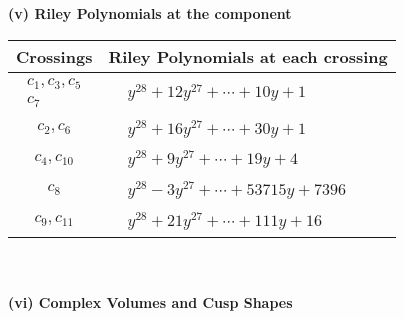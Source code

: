 \documentclass[1p]{elsarticle_modified}
\theoremstyle{definition}
\begin{document}
\newpage\renewcommand{\arraystretch}{1}
\flushleft \textbf{(v) Riley Polynomials at the component}\newline \\
\begin{tabular}{m{50pt}|m{274pt}}
Crossings & \hspace{64pt}Riley Polynomials at each crossing \\
\hline $$\begin{aligned}c_{1},c_{3},c_{5}\\c_{7}\end{aligned}$$&$\begin{aligned}
&y^{28}+12 y^{27}+\cdots+10 y+1
\end{aligned}$\\
\hline $$\begin{aligned}c_{2},c_{6}\end{aligned}$$&$\begin{aligned}
&y^{28}+16 y^{27}+\cdots+30 y+1
\end{aligned}$\\
\hline $$\begin{aligned}c_{4},c_{10}\end{aligned}$$&$\begin{aligned}
&y^{28}+9 y^{27}+\cdots+19 y+4
\end{aligned}$\\
\hline $$\begin{aligned}c_{8}\end{aligned}$$&$\begin{aligned}
&y^{28}-3 y^{27}+\cdots+53715 y+7396
\end{aligned}$\\
\hline $$\begin{aligned}c_{9},c_{11}\end{aligned}$$&$\begin{aligned}
&y^{28}+21 y^{27}+\cdots+111 y+16
\end{aligned}$\\
\hline
\end{tabular}\\~\\
\newpage\flushleft \textbf{(vi) Complex Volumes and Cusp Shapes}
\end{document}
